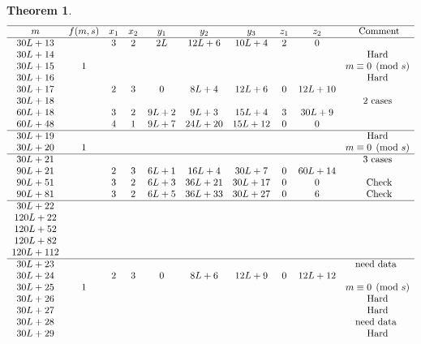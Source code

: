 \documentclass[12pt]{article}
\newtheorem{theoremfoo}{Theorem}[section] %
\newenvironment{theorem}{\pagebreak[1]\begin{theoremfoo}}{\end{theoremfoo}}
\begin{document}
\begin{theorem}
\[
\begin{array}{cccccccccc}
\hline
m            & f(m,s) & x_1 & x_2 & y_1  & y_2    & y_3       & z_1 & z_2 & \hbox{ Comment}   \cr
\hline
30L+13         &        & 3   & 2   & 2L   & 12L+6   & 10L+4     & 2   & 0& \cr
30L+14            &        &     &     &      &        &           &     &       &  \hbox{Hard}\cr
30L+15          & 1    &     &     &      &        &           &     &    & m\equiv 0 \pmod s\cr 
30L+16            &        &     &     &      &        &           &     &       &  \hbox{Hard}\cr
30L+17         &        & 2   & 3   & 0    & 8L+4   & 12L+6     & 0   & 12L+10& \cr
30L+18         &        &     &     &      &        &           &     &       &  \hbox{ 2 cases }\cr
60L+18         &        & 3   & 2   & 9L+2 & 9L+3   & 15L+4     & 3   & 30L+9 &  \cr
60L+48         &        & 4   & 1   & 9L+7 & 24L+20 & 15L+12    & 0   & 0     &   \cr
\hline
30L+19            &        &     &     &      &        &           &     &       &  \hbox{Hard}\cr
30L+20          & 1    &     &     &      &        &           &     &    & m\equiv 0 \pmod s\cr 
\hline
30L+21         &        &     &     &      &        &           &     &       &  \hbox{3 cases}\cr
90L+21         &        & 2   & 3   & 6L+1 & 16L+4  & 30L+7     & 0   & 60L+14&               \cr 
90L+51         &        & 3   & 2   & 6L+3 & 36L+21 & 30L+17    & 0   & 0     & \hbox{ Check} \cr
90L+81         &        & 3   & 2   & 6L+5 & 36L+33 & 30L+27    & 0   & 6     & \hbox{ Check} \cr
\hline
30L+22         &        &     &     &      &        &           &     &       &  \cr
120L+22         &        &     &     &      &        &           &     &       &  \cr
120L+52         &        &     &     &      &        &           &     &       &  \cr
120L+82         &        &     &     &      &        &           &     &       &  \cr
120L+112         &        &     &     &      &        &           &     &       &  \cr
\hline
30L+23         &        &     &     &      &        &           &     &       &  \hbox{need data }\cr
30L+24         &        & 2   & 3   & 0    & 8L+6   & 12L+9     & 0   & 12L+12& \cr
30L+25          & 1    &     &     &      &        &           &     &    & m\equiv 0 \pmod s\cr 
30L+26            &        &     &     &      &        &           &     &       &  \hbox{Hard}\cr
30L+27            &        &     &     &      &        &           &     &       &  \hbox{Hard}\cr
30L+28         &        &     &     &      &        &           &     &       &  \hbox{need data }\cr
30L+29            &        &     &     &      &        &           &     &       &  \hbox{Hard}\cr
\end{array}
\]

\end{theorem}
\end{document}
